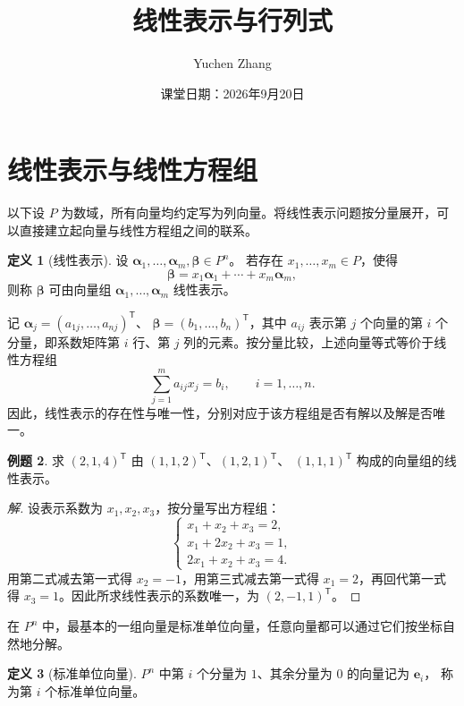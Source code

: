 \documentclass[UTF8, fontset=fandol, a4paper, 12pt]{ctexart}
\title{线性表示与行列式}
\author{Yuchen Zhang}
\date{课堂日期：2026年9月20日}
\makeatletter
\theoremstyle{definition}
\newtheorem{definition}{定义}[section]
\newtheorem{example}[definition]{例题}
\renewcommand{\maketitle}{%
  \begin{center}
    {\LARGE\bfseries \@title\par}\vspace{0.6em}
    \@author\par\vspace{0.2em}
    {\small \@date\par}
  \end{center}
}
\makeatother
\begin{document}
\maketitle

\section{线性表示与线性方程组}

以下设 $P$ 为数域，所有向量均约定写为列向量。将线性表示问题按分量展开，可以直接建立起向量与线性方程组之间的联系。

\begin{definition}[线性表示]
设 $\boldsymbol\alpha_1,\ldots,\boldsymbol\alpha_m,\boldsymbol\beta\in P^n$。
若存在 $x_1,\ldots,x_m\in P$，使得
\[
\boldsymbol\beta=x_1\boldsymbol\alpha_1+\cdots+x_m\boldsymbol\alpha_m,
\]
则称 $\boldsymbol\beta$ 可由向量组 $\boldsymbol\alpha_1,\ldots,\boldsymbol\alpha_m$ 线性表示。
\end{definition}

记 $\boldsymbol\alpha_j=(a_{1j},\ldots,a_{nj})^{\mathsf T}$、
$\boldsymbol\beta=(b_1,\ldots,b_n)^{\mathsf T}$，其中 $a_{ij}$ 表示第 $j$ 个向量的第 $i$ 个分量，即系数矩阵第 $i$ 行、第 $j$ 列的元素。按分量比较，上述向量等式等价于线性方程组
\[
\sum_{j=1}^m a_{ij}x_j=b_i,\qquad i=1,\ldots,n.
\]
因此，线性表示的存在性与唯一性，分别对应于该方程组是否有解以及解是否唯一。

\begin{example}
求 $(2,1,4)^{\mathsf T}$ 由 $(1,1,2)^{\mathsf T}$、$(1,2,1)^{\mathsf T}$、
$(1,1,1)^{\mathsf T}$ 构成的向量组的线性表示。
\end{example}
\begin{proof}[解]
设表示系数为 $x_1,x_2,x_3$，按分量写出方程组：
\[
\begin{cases}x_1+x_2+x_3=2,\\x_1+2x_2+x_3=1,\\2x_1+x_2+x_3=4.\end{cases}
\]
用第二式减去第一式得 $x_2=-1$，用第三式减去第一式得 $x_1=2$，再回代第一式得 $x_3=1$。因此所求线性表示的系数唯一，为 $(2,-1,1)^{\mathsf T}$。
\end{proof}

在 $P^n$ 中，最基本的一组向量是标准单位向量，任意向量都可以通过它们按坐标自然地分解。

\begin{definition}[标准单位向量]
$P^n$ 中第 $i$ 个分量为 $1$、其余分量为 $0$ 的向量记为 $\boldsymbol e_i$，
称为第 $i$ 个标准单位向量。
\end{definition}
\end{document}
